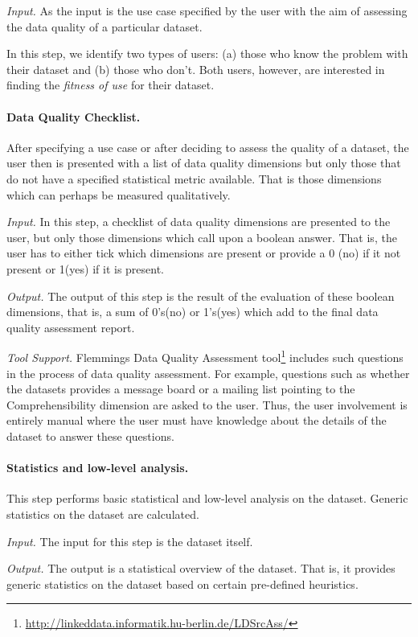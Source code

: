 \emph{Input.} As the input is the use case specified by the user with the aim of assessing the data quality of a particular dataset.

In this step, we identify two types of users: (a) those who know the problem with their dataset and (b) those who don't. 
Both users, however, are interested in finding the \emph{fitness of use} for their dataset.

\paragraph{\textbf{Data Quality Checklist.}}
After specifying a use case or after deciding to assess the quality of a dataset, the user then is presented with a list of data quality dimensions but only those that do not have a specified statistical metric available. 
That is those dimensions which can perhaps be measured qualitatively. 

\emph{Input.} In this step, a checklist of data quality dimensions are presented to the user, but only those dimensions which call upon a boolean answer. 
That is, the user has to either tick which dimensions are present or provide a 0 (no) if it not present or 1(yes) if it is present.

\emph{Output.} The output of this step is the result of the evaluation of these boolean dimensions, that is, a sum of 0's(no) or 1's(yes) which add to the final data quality assessment report. 

\emph{Tool Support.} Flemmings Data Quality Assessment tool\footnote{\url{http://linkeddata.informatik.hu-berlin.de/LDSrcAss/}} includes such questions in the process of data quality assessment.
For example, questions such as whether the datasets provides a message board or a mailing list pointing to the Comprehensibility dimension are asked to the user. 
Thus, the user involvement is entirely manual where the user must have knowledge about the details of the dataset to answer these questions.

\paragraph{\textbf{Statistics and low-level analysis.}}
This step performs basic statistical and low-level analysis on the dataset.
Generic statistics on the dataset are calculated. 

\emph{Input.} The input for this step is the dataset itself. 

\emph{Output.} The output is a statistical overview of the dataset. 
That is, it provides generic statistics on the dataset based on certain pre-defined heuristics.

